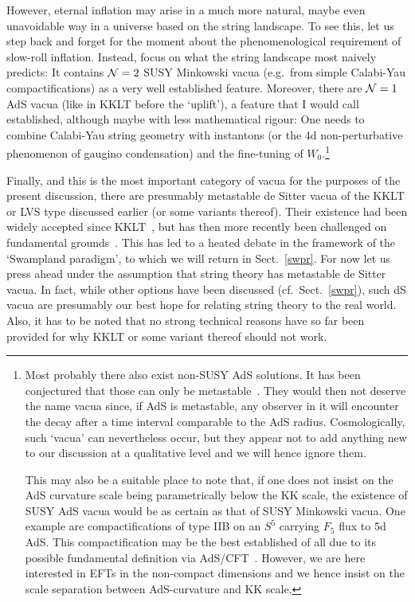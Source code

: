 \documentclass[12pt]{article}
\numberwithin{equation}{section}
\begin{document}
However, eternal inflation may arise in a much more natural, maybe even unavoidable way in a universe based on the string landscape. To see this, let us step back and forget for the moment about the phenomenological requirement of slow-roll inflation. Instead, focus on what the string landscape most naively predicts: It contains ${\cal N}=2$ SUSY Minkowski vacua (e.g.~from simple Calabi-Yau compactifications) as a very well established feature. Moreover, there are ${\cal N}=1$ AdS vacua (like in KKLT before the `uplift'), a feature that I would call established, although maybe with less mathematical rigour: One needs to combine Calabi-Yau string geometry with instantons (or the 4d non-perturbative phenomenon of gaugino condensation) and the fine-tuning of $W_0$.\footnote{
Most 
probably there also exist non-SUSY AdS solutions. It has been conjectured that those can only be metastable~\cite{Ooguri:2016pdq, Freivogel:2016qwc}. They would then not deserve the name vacua since, if AdS is metastable, any observer in it will encounter the decay after a time interval comparable to the AdS radius. Cosmologically, such `vacua' can nevertheless occur, but they appear not to add anything new to our discussion at a qualitative level and we will hence ignore them.

This may also be a suitable place to note that, if one does not insist on the AdS curvature scale being parametrically below the KK scale, the existence of SUSY AdS vacua would be as certain as that of SUSY Minkowski vacua. One example are compactifications of type IIB on an $S^5$ carrying $F_5$ flux to 5d AdS. This compactification may be the best established of all due to its possible fundamental definition via AdS/CFT~\cite{Maldacena:1997re, Aharony:1999ti}. However, we are here interested in EFTs in the non-compact dimensions and we hence insist on the scale separation between AdS-curvature and KK scale. 
}

Finally, and this is the most important category of vacua for the purposes of the present discussion, there are presumably metastable de Sitter vacua of the KKLT or LVS type discussed earlier (or some variants thereof). Their existence had been widely accepted since KKLT~\cite{Kachru:2003aw}, but has then more recently been challenged on fundamental grounds~\cite{Danielsson:2018ztv, Obied:2018sgi, Garg:2018reu, Ooguri:2018wrx}. This has led to a heated debate in the framework of the `Swampland paradigm', to which we will return in Sect.~\ref{swpr}. For now let us press ahead under the assumption that string theory has metastable de Sitter vacua. In fact, while other options have been discussed (cf.~Sect.~\ref{swpr}), such dS vacua are presumably our best hope for relating string theory to the real world. Also, it has to be noted that no strong technical reasons have so far been provided for why KKLT or some variant thereof should not work.
\end{document}
